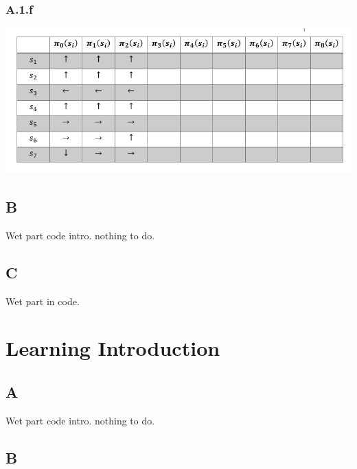 \documentclass[12pt]{article}
\begin{document}
\subsubsection*{A.1.f}

\includegraphics[]{hw3/plots/A_6.PNG}

\subsection*{B}
Wet part code intro. nothing to do.

\subsection*{C}
Wet part in code.

\section*{Learning Introduction}

\subsection*{A}
Wet part code intro. nothing to do.

\subsection*{B}
\end{document}
